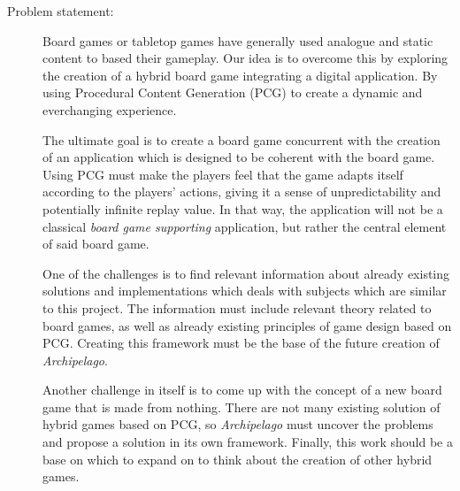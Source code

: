 \begin{description}
\item[Problem statement:]
Board games or tabletop games have generally used analogue and static content to based their gameplay. Our idea is to overcome this by exploring the creation of a hybrid board game integrating a digital application. By using Procedural Content Generation (PCG) to create a dynamic and everchanging experience.

The ultimate goal is to create a board game concurrent with the creation of an application which is designed to be coherent with the board game. Using PCG must make the players feel that the game adapts itself according to the players' actions, giving it a sense of unpredictability and potentially infinite replay value. In that way, the application will not be a classical \textit{board game supporting} application, but rather the central element of said board game.

One of the challenges is to find relevant information about already existing solutions and implementations which deals with subjects which are similar to this project. The information must include relevant theory related to board games, as well as already existing principles of game design based on PCG. Creating this framework must be the base of the future creation of \textit{Archipelago}.

Another challenge in itself is to come up with the concept of a new board game that is made from nothing. There are not many existing solution of hybrid games based on PCG, so \textit{Archipelago} must uncover the problems and propose a solution in its own framework. Finally, this work should be a base on which to expand on to think about the creation of other hybrid games. 
\end{description}

